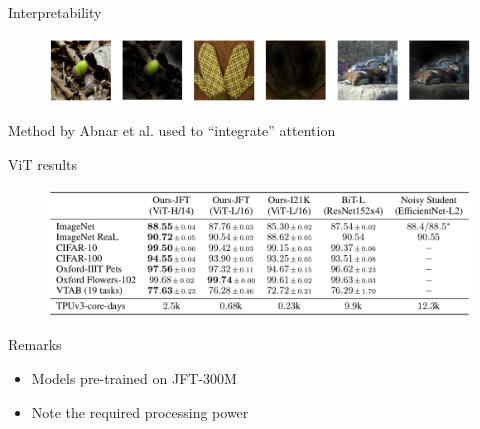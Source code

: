 \documentclass[xcolor=pdftex,dvipsnames,table,mathserif]{beamer}
\begin{document}
\begin{frame}{Interpretability}

\begin{figure}[ht]
  \centering
  \includegraphics[width=\textwidth]{attention2}
\end{figure}

Method by Abnar et al. used to ``integrate'' attention \cite{abnar_quantifying_2020}

\end{frame}




\begin{frame}{ViT results}

\begin{figure}[ht]
  \centering
  \includegraphics[width=\textwidth]{vit_table}
\end{figure}

\begin{block}{Remarks}
  \begin{itemize}
  \item Models pre-trained on JFT-300M
  \item Note the required processing power
  \end{itemize}

\end{block}

\end{frame}
\end{document}

